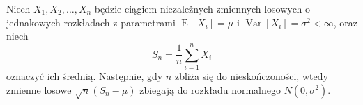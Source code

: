 \documentclass{article}
\begin{document}
Niech $X_1, X_2, \ldots, X_n$ będzie ciągiem niezależnych
zmiennych losowych o jednakowych rozkładach z parametrami 
$\operatorname{E}[X_i] = \mu$ i $\operatorname{Var}[X_i] = \sigma^2 < \infty$, 
oraz niech
\begin{equation*}
S_n = \frac{1}{n}\sum_{i=1}^{n} X_i
\end{equation*}
oznaczyć ich średnią. Następnie, gdy $n$ zbliża się do 
nieskończoności, wtedy zmienne losowe $\sqrt{n}(S_n - \mu)$ 
zbiegają do rozkładu normalnego $N(0, \sigma^2)$.

\end{document}
